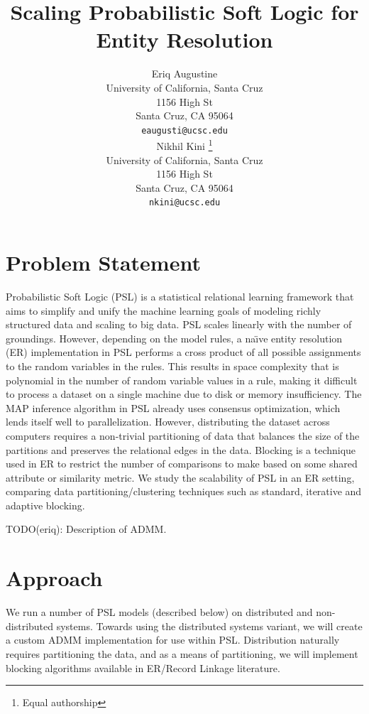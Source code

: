 \documentclass{article}
\title{Scaling Probabilistic Soft Logic for Entity Resolution}
\author{
  Eriq Augustine \\
  University of California, Santa Cruz\\
  1156 High St\\
  Santa Cruz, CA 95064\\
  \texttt{eaugusti@ucsc.edu} \\
\And
 Nikhil Kini \thanks{Equal authorship} \\
 University of California, Santa Cruz\\
 1156 High St\\
 Santa Cruz, CA 95064\\
 \texttt{nkini@ucsc.edu} \\
}
\begin{document}

\maketitle

\section{Problem Statement}
  Probabilistic Soft Logic (PSL) is a statistical relational learning framework that aims to simplify and unify the machine learning goals of modeling richly structured data and scaling to big data. PSL scales linearly with the number of groundings. However, depending on the model rules, a  na\"{\i}ve entity resolution (ER) implementation in PSL performs a cross product of all possible assignments to the random variables in the rules. This results in space complexity that is polynomial in the number of random variable values in a rule, making it difficult to process a dataset on a single machine due to disk or memory insufficiency. The MAP inference algorithm in PSL already uses consensus optimization, which lends itself well to parallelization. However, distributing the dataset across computers requires a non-trivial partitioning of data that balances the size of the partitions and preserves the relational edges in the data. Blocking is a technique used in ER to restrict the number of comparisons to make based on some shared attribute or similarity metric. We study the scalability of PSL in an ER setting, comparing data partitioning/clustering techniques such as standard, iterative and adaptive blocking.

 TODO(eriq): Description of ADMM.

\section{Approach}

We run a number of PSL models (described below) on distributed and non-distributed systems. Towards using the distributed systems variant, we will create a custom ADMM implementation for use within PSL. Distribution naturally requires partitioning the data, and as a means of partitioning, we will implement blocking algorithms available in ER/Record Linkage literature.
\end{document}

